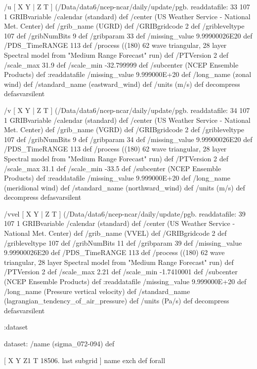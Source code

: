 \begin{ingrid}
  /u { [ X Y | Z T ] (/Data/data6/ncep-ncar/daily/update/pgb.%
  readdatafile:
  33 107 1 GRIBvariable
  /calendar (standard) def
  /center (US Weather Service - National Met. Center) def
  /grib_name (UGRD) def
  /GRIBgridcode 2 def
  /gribleveltype 107 def
  /gribNumBits 9 def
  /gribparam 33 def
  /missing_value 9.99900026E20 def
  /PDS_TimeRANGE 113 def
  /process ((180) 62 wave triangular, 28 layer Spectral model from "Medium Range Forecast" run) def
  /PTVersion 2 def
  /scale_max 31.9 def
  /scale_min -32.799999 def
  /subcenter (NCEP Ensemble Products) def
  :readdatafile
  /missing_value 9.999000E+20 def
  /long_name (zonal wind) def
  /standard_name (eastward_wind) def
  /units (m/s) def
  decompress
  } defasvarsilent

  /v { [ X Y | Z T ] (/Data/data6/ncep-ncar/daily/update/pgb.%
  readdatafile:
  34 107 1 GRIBvariable
  /calendar (standard) def
  /center (US Weather Service - National Met. Center) def
  /grib_name (VGRD) def
  /GRIBgridcode 2 def
  /gribleveltype 107 def
  /gribNumBits 9 def
  /gribparam 34 def
  /missing_value 9.99900026E20 def
  /PDS_TimeRANGE 113 def
  /process ((180) 62 wave triangular, 28 layer Spectral model from "Medium Range Forecast" run) def
  /PTVersion 2 def
  /scale_max 31.1 def
  /scale_min -33.5 def
  /subcenter (NCEP Ensemble Products) def
  :readdatafile
  /missing_value 9.999000E+20 def
  /long_name (meridional wind) def
  /standard_name (northward_wind) def
  /units (m/s) def
  decompress
  } defasvarsilent

  /vvel { [ X Y | Z T ] (/Data/data6/ncep-ncar/daily/update/pgb.%
  readdatafile:
  39 107 1 GRIBvariable
  /calendar (standard) def
  /center (US Weather Service - National Met. Center) def
  /grib_name (VVEL) def
  /GRIBgridcode 2 def
  /gribleveltype 107 def
  /gribNumBits 11 def
  /gribparam 39 def
  /missing_value 9.99900026E20 def
  /PDS_TimeRANGE 113 def
  /process ((180) 62 wave triangular, 28 layer Spectral model from "Medium Range Forecast" run) def
  /PTVersion 2 def
  /scale_max 2.21 def
  /scale_min -1.7410001 def
  /subcenter (NCEP Ensemble Products) def
  :readdatafile
  /missing_value 9.999000E+20 def
  /long_name (Pressure vertical velocity) def
  /standard_name (lagrangian_tendency_of_air_pressure) def
  /units (Pa/s) def
  decompress
  } defasvarsilent

 :dataset

 dataset: /name (sigma_072-094) def 

  [ X Y Z1 T 18506. last subgrid ] { name exch def } forall


\end{ingrid}
